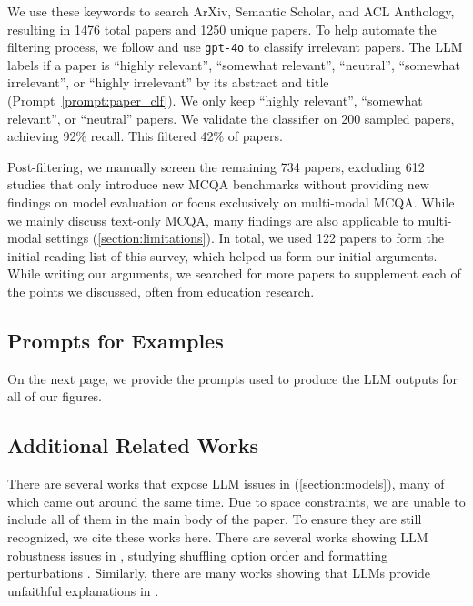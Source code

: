 We use these keywords to search ArXiv, Semantic Scholar, and ACL Anthology, resulting in 1476 total papers and 1250 unique papers.
To help automate the filtering process, we follow \citet{schulhoff2024prompt} and use \texttt{gpt-4o} to classify irrelevant papers.
The LLM labels if a paper is ``highly relevant'', ``somewhat relevant'', ``neutral'', ``somewhat irrelevant'', or ``highly irrelevant'' by its abstract and title (Prompt~\ref{prompt:paper_clf}).
We only keep ``highly relevant'', ``somewhat relevant'', or ``neutral'' papers.
We validate the classifier on 200 sampled papers, achieving 92\% recall.
This filtered 42\% of papers.

Post-filtering, we manually screen the remaining 734 papers, excluding 612 studies that only introduce new MCQA benchmarks without providing new findings on model evaluation or focus exclusively on multi-modal MCQA.
While we mainly discuss text-only MCQA, many findings are also applicable to multi-modal settings (\cref{section:limitations}).
In total, we used 122 papers to form the initial reading list of this survey, which helped us form our initial arguments.
While writing our arguments, we searched for more papers to supplement each of the points we discussed, often from education research.


\subsection{Prompts for Examples} \label{appendix:prompts}

On the next page, we provide the prompts used to produce the LLM outputs for all of our figures.

\subsection{Additional Related Works}

There are several works that expose LLM issues in \mcqa (\cref{section:models}), many of which came out around the same time.
Due to space constraints, we are unable to include all of them in the main body of the paper. To ensure they are still recognized, we cite these works here.
There are several works showing LLM robustness issues in \mcqa, studying shuffling option order and formatting perturbations \cite{zong2023fool, pezeshkpour2023large, Ranaldi2023HANSAY, Zheng2023LargeLM, Li2024AnchoredAU, gupta2024changing, alzahrani2024benchmarks, long2024llms, lyu2024beyond, tsvilodub2024predictions, khatun2024study}.
Similarly, there are many works showing that LLMs provide unfaithful explanations in \mcqa \cite{agarwal2024faithfulness, kim2024can, madsen2024self, lyu2023faithful, lanham2023measuring, turpin2024language}.

\clearpage
